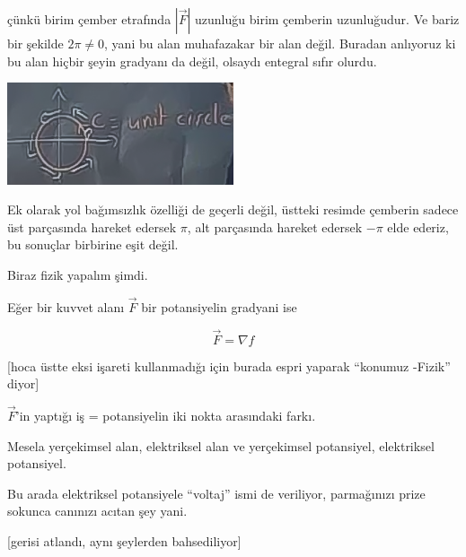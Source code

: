 \documentclass[12pt,fleqn]{article}\usepackage{../../common}
\begin{document}
çünkü birim çember etrafında $|\vec{F}|$ uzunluğu birim çemberin uzunluğudur. Ve
bariz bir şekilde $2\pi \ne 0$, yani bu alan muhafazakar bir alan değil. Buradan
anlıyoruz ki bu alan hiçbir şeyin gradyanı da değil, olsaydı entegral sıfır
olurdu.

\includegraphics[height=3cm]{20_9.png}

Ek olarak yol bağımsızlık özelliği de geçerli değil, üstteki resimde çemberin
sadece üst parçasında hareket edersek $\pi$, alt parçasında hareket edersek
$-\pi$ elde ederiz, bu sonuçlar birbirine eşit değil.

Biraz fizik yapalım şimdi.

Eğer bir kuvvet alanı $\vec{F}$ bir potansiyelin gradyani ise 

$$ \vec{F} = \nabla f $$

[hoca üstte eksi işareti kullanmadığı için burada espri yaparak ``konumuz
-Fizik'' diyor]

$\vec{F}$'in yaptığı iş = potansiyelin iki nokta arasındaki farkı. 

Mesela yerçekimsel alan, elektriksel alan ve yerçekimsel potansiyel,
elektriksel potansiyel. 

Bu arada elektriksel potansiyele ``voltaj'' ismi de veriliyor, parmağınızı
prize sokunca canınızı acıtan şey yani. 

[gerisi atlandı, aynı şeylerden bahsediliyor]
\end{document}
